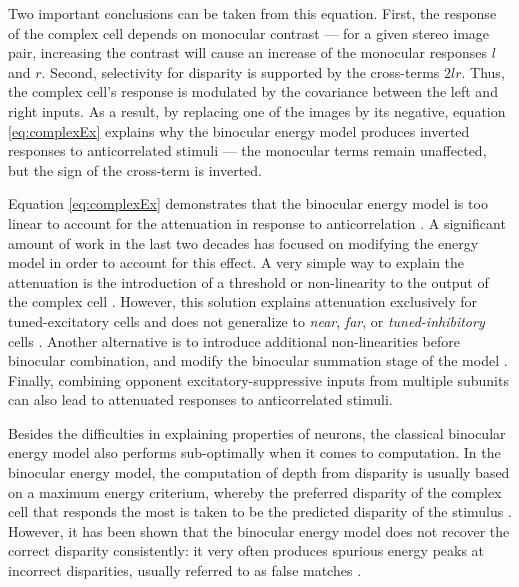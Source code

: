 Two important conclusions can be taken from this equation. First, the response of the complex cell depends on monocular contrast --- for a given stereo image pair, increasing the contrast will cause an increase of the monocular responses $l$ and $r$. Second, selectivity for disparity is supported by the cross-terms $2lr$. Thus, the complex cell's response is modulated by the covariance between the left and right inputs. As a result, by replacing one of the images by its negative, equation \ref{eq:complexEx} explains why the binocular energy model produces inverted responses to anticorrelated stimuli --- the monocular terms remain unaffected, but the sign of the cross-term is inverted.

Equation \ref{eq:complexEx} demonstrates that the binocular energy model is too linear to account for the attenuation in response to anticorrelation \cite{Cumming:1997ve}. A significant amount of work in the last two decades has focused on modifying the energy model in order to account for this effect. A very simple way to explain the attenuation is the introduction of a threshold or non-linearity to the output of the complex cell \cite{Lippert:2001fk, Read:2002kx}. However, this solution explains attenuation exclusively for tuned-excitatory cells and does not generalize to \textit{near}, \textit{far}, or \textit{tuned-inhibitory} cells \cite{Read:2002kx}. Another alternative is to introduce additional non-linearities before binocular combination, and modify the binocular summation stage of the model \cite{Read:2002kx,Read:2003ij}. Finally, combining opponent excitatory-suppressive inputs from multiple subunits \cite{Haefner:2008jg, Tanabe:2008lo} can also lead to attenuated responses to anticorrelated stimuli.

Besides the difficulties in explaining properties of neurons, the classical binocular energy model also performs sub-optimally when it comes to computation. In the binocular energy model, the computation of depth from disparity is usually based on a maximum energy criterium, whereby the preferred disparity of the complex cell that responds the most is taken to be the predicted disparity of the stimulus \cite{Qian:1997bu,Qian:1994:CSD:1362347.1362350,Read:2002kx}. However, it has been shown that the binocular energy model does not recover the correct disparity consistently: it very often produces spurious energy peaks at incorrect disparities, usually referred to as false matches \cite{Fleet:1996tq,Read:2007nx}.

